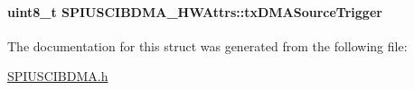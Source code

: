 \paragraph[{tx\+D\+M\+A\+Source\+Trigger}]{\setlength{\rightskip}{0pt plus 5cm}uint8\+\_\+t S\+P\+I\+U\+S\+C\+I\+B\+D\+M\+A\+\_\+\+H\+W\+Attrs\+::tx\+D\+M\+A\+Source\+Trigger}\label{struct_s_p_i_u_s_c_i_b_d_m_a___h_w_attrs_a8cf8e43314d66883d1d680bd2b1d2499}


The documentation for this struct was generated from the following file\+:\begin{DoxyCompactItemize}
\item 
\hyperlink{_s_p_i_u_s_c_i_b_d_m_a_8h}{S\+P\+I\+U\+S\+C\+I\+B\+D\+M\+A.\+h}\end{DoxyCompactItemize}
